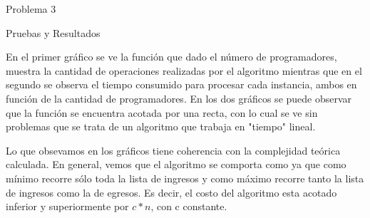 \begin{section}{Problema 3}
\begin{subsection}{Pruebas y Resultados}

	En el primer gráfico se ve la función que dado el número de programadores, muestra la cantidad de operaciones realizadas por el algoritmo mientras que en el segundo se observa el tiempo consumido para procesar cada instancia, ambos en función de la cantidad de programadores.
	En los dos gráficos se puede observar que la función se encuentra acotada por una recta, con lo cual se ve sin problemas que se trata de un algoritmo que trabaja en "tiempo" lineal.

	Lo que obsevamos en los gráficos tiene coherencia con la complejidad teórica calculada. 
	En general, vemos que el algoritmo se comporta como  ya que como mínimo recorre sólo toda la lista de ingresos y como máximo recorre tanto la lista de ingresos como la de egresos. Es decir, el costo del algoritmo esta acotado inferior y superiormente por $c*n$, con c constante.

	\end{subsection}
\end{section}







